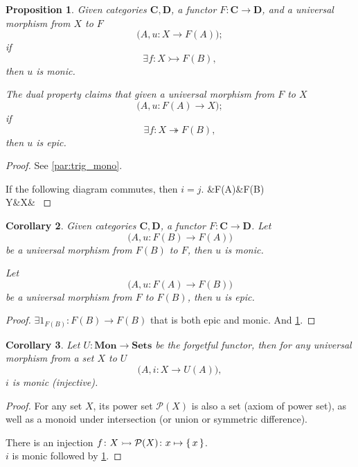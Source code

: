 \documentclass[12pt, letterpaper]{article}
\newcommand{\bfC}{\mathbf{C}}
\newcommand{\bfD}{\mathbf{D}}
\newcommand{\power}{\mathcal{P}}
\newenvironment{centikzcd}{\center\tikzcd}{\endtikzcd\endcenter}
\newtheorem{prop}{Proposition}[section]
\newtheorem{cor}[prop]{Corollary}
\theoremstyle{definition}
\theoremstyle{remark}
\theoremstyle{definition}
\theoremstyle{plain}
\numberwithin{equation}{section}
\begin{document}
	\begin{prop}\label{prop:UMP_mono_epic}
		Given categories $\bfC,\bfD$, a functor $F\colon \bfC\to \bfD$, and a universal morphism from $X$ to $F$
		\[ \big(A,u\colon X\to F(A)\big) ;\]
		if \[ \exists f\colon X\rightarrowtail F(B) ,\]
		then $u$ is monic.
		
		The dual property claims that
		given a universal morphism from $F$ to $X$
		\[ \big(A,u\colon F(A)\to X\big) ;\]
		if \[ \exists f\colon X\twoheadrightarrow F(B) ,\]
		then $u$ is epic.
	\end{prop}
	\begin{proof}
		See \ref{par:trig_mono}.
		
		If the following diagram commutes, then $i=j$.
		\begin{centikzcd}
			&F(A)&F(B)\\
			Y&X\ar[u,tail,"u"]\ar[ur,tail,"f"']&
		\end{centikzcd}
	\end{proof}

	\begin{cor}
		Given categories $\bfC,\bfD$, a functor $F\colon \bfC\to \bfD$. Let
		\[ \big(A,u\colon F(B)\to F(A)\big) \]
		be a universal morphism from $F(B)$ to $F$, then $u$ is monic.
		
		Let
		\[ \big(A,u\colon F(A)\to F(B)\big) \]
		be a universal morphism from $F$ to $F(B)$, then $u$ is epic.
	\end{cor}
	\begin{proof}
		$\exists 1_{F(B)}\colon F(B)\to F(B)$ that is both epic and monic.
		And \ref{prop:UMP_mono_epic}.
	\end{proof}

	\begin{cor}
		Let $U\colon \mathbf{Mon}\to \mathbf{Sets}$ be the forgetful functor,
		then for any universal morphism from a set $X$ to $U$
		\[ \big(A, i\colon X \to U(A) \big), \]
		$i$ is monic (injective).
	\end{cor}
	\begin{proof}
		For any set $X$, its power set $\power(X)$ is also a set (axiom of power set),
		as well as a monoid under intersection (or union or symmetric difference).
		
		There is an injection $f\colon X\rightarrowtail\power(X)\colon x\mapsto \set{x}$.\\
		$i$ is monic followed by \ref{prop:UMP_mono_epic}.
	\end{proof}
\end{document}
